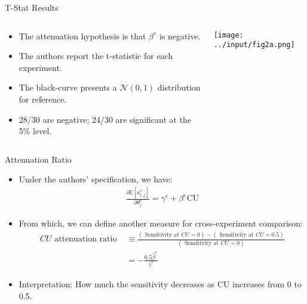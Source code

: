 \documentclass[11pt, aspectratio=169]{beamer}
\begin{document}
\begin{frame}{T-Stat Results}


    \begin{columns}
    
        \begin{column}{0.3\textwidth}
            \begin{itemize}
                \item The attenuation hypothesis 
                    is that $\beta^e$ is negative.
                \item The authors report the 
                    t-statistic for
                    each experiment.
                \item The black-curve presents 
                    a $\mathcal{N}(0,1)$ distribution
                    for reference.
                \item 28/30 are negative; 24/30 are 
                    significant at the 5\% level.
            \end{itemize}
        \end{column}
    
        \begin{column}{0.7\textwidth}
            \texttt{[image: ../input/fig2a.png]}
        \end{column}
    
    \end{columns}
    
\end{frame}


\begin{frame}{Attenuation Ratio}
    
    \begin{itemize}
        \item Under the authors' specification, we have:
            \begin{align}
                \frac{\partial \mathbb{E}\left[a_{i, j}^e\right]}{\partial \theta_j^e}=\gamma^e+\beta^e \mathrm{CU}
            \end{align}
        \item From which, we can define another measure for 
            cross-experiment comparison:
            \begin{align}
                C U \text { attenuation ratio } & \equiv \frac{(\text { Sensitivity at } C U=0)-(\text { Sensitivity at } C U=0.5)}{(\text { Sensitivity at } C U=0)} \\
                & =-\frac{0.5 \hat{\beta}^e}{\hat{\gamma}^e}
            \end{align}
        \item Interpretation: How much the sensitivity
            decreases as CU increases from 0 to 0.5.
    \end{itemize}
    
\end{frame}
\end{document}

